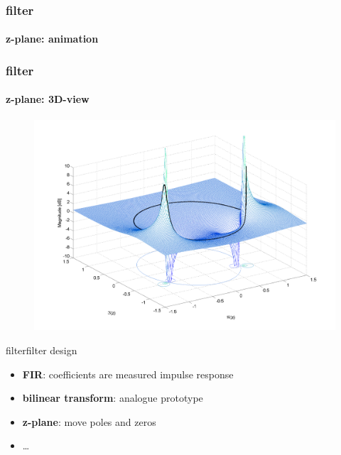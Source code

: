 	\begin{frame}\frametitle{filter}\framesubtitle{z-plane: animation}
	\end{frame}
	
	\begin{frame}\frametitle{filter}\framesubtitle{z-plane: 3D-view}
			\begin{figure}[!hbt]
				\begin{center}
					\includegraphics[scale=.26]{graph/PoleZero3d}
				\end{center}
			\end{figure}
	\end{frame}
	
	\begin{frame}{filter}{filter design}
		\begin{itemize}
			\item	\textbf{FIR}: coefficients are measured impulse response
			\pause
			\item	\textbf{bilinear transform}: analogue prototype
			\pause
			\item	\textbf{z-plane}: move poles and zeros
			\item	\ldots	
		\end{itemize}
	\end{frame}
	
